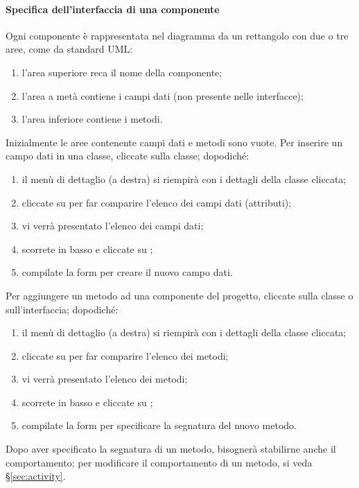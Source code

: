 \paragraph{Specifica dell'interfaccia di una componente} \label{par:inter} Ogni componente è rappresentata nel diagramma da un rettangolo con due o tre aree, come da standard UML:
\begin{enumerate}
	\item l'area superiore reca il nome della componente;
	\item l'area a metà contiene i campi dati (non presente nelle interfacce);
	\item l'area inferiore contiene i metodi.
\end{enumerate}

Inizialmente le aree contenente campi dati e metodi sono vuote. Per inserire un campo dati in una classe, cliccate sulla classe; dopodiché:
\begin{enumerate}
	\item il menù di dettaglio (a destra) si riempirà con i dettagli della classe cliccata;
	\item cliccate su  per far comparire l'elenco dei campi dati (attributi);
	\item vi verrà presentato l'elenco dei campi dati;
	\item scorrete in basso e cliccate su ;
	\item compilate la form per creare il nuovo campo dati.
\end{enumerate}

Per aggiungere un metodo ad una componente del progetto, cliccate sulla classe o sull'interfaccia; dopodiché:
\begin{enumerate}
	\item il menù di dettaglio (a destra) si riempirà con i dettagli della classe cliccata;
	\item cliccate su  per far comparire l'elenco dei metodi;
	\item vi verrà presentato l'elenco dei metodi;
	\item scorrete in basso e cliccate su ;
	\item compilate la form per specificare la segnatura del nuovo metodo.
\end{enumerate}
Dopo aver specificato la segnatura di un metodo, bisognerà stabilirne anche il comportamento; per modificare il comportamento di un metodo, si veda §\ref{sec:activity}.

